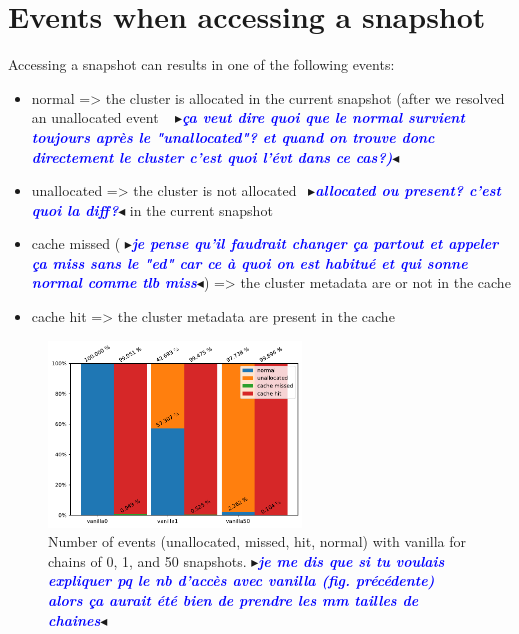 \documentclass[sigplan,screen,10pt]{acmart}
\newcommand{\mynote}[2]{\fbox{\bfseries\sffamily\footnotesize{\textbf{#1}}}
 {\small$\blacktriangleright$\textsf{\emph{#2}}$\blacktriangleleft$}}
\newcommand{\mynote}[2]{}
\newcommand{\stella}[1]{\mynote{\textcolor{red}{Stella}}{\textcolor{blue}{\textbf{#1}}}}
\begin{document}
	\section*{Events when accessing a snapshot}%
	Accessing a snapshot can results in one of the following events:
	\begin{itemize}
		\item normal => the cluster is allocated in the current snapshot (after we resolved an unallocated event ~\stella{ça veut dire quoi que le normal survient toujours après le "unallocated"? et quand on trouve donc directement le cluster c'est quoi l'évt dans ce cas?)}
		\item unallocated => the cluster is not allocated~\stella{allocated ou present? c'est quoi la diff?} in the current snapshot
		\item cache missed (\stella{je pense qu'il faudrait changer ça partout et appeler ça miss sans le "ed" car ce à quoi on est habitué et qui sonne normal comme tlb miss}) => the cluster metadata are or not in the cache
		\item cache hit => the cluster metadata are present in the cache
	\end{itemize}
		
	\begin{figure}[h]
		\center
		\includegraphics[width=0.6\textwidth]{number_events_per_chain_va.pdf}
		\caption{Number of events (unallocated, missed, hit, normal) with vanilla for chains of 0, 1, and 50 snapshots.\stella{je me dis que si tu voulais expliquer pq le nb d'accès avec vanilla (fig. précédente) alors ça aurait été bien de prendre les mm tailles de chaines}}
		\label{fig:fig36}
	\end{figure}
\end{document}
